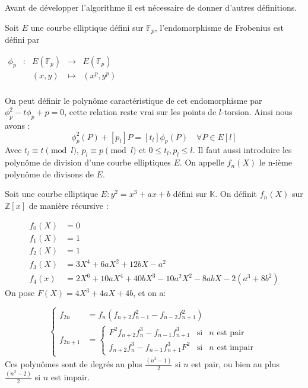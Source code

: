 \documentclass{article}
\begin{document}
Avant de développer l'algorithme il est nécessaire de donner d'autres définitions. 

\begin{defi}[Frobenius]
Soit $E$ une courbe elliptique défini sur $\mathbb{F}_p$, l'endomorphisme de Frobenius est défini par 

$\begin{array}{ccccc}
\phi_p & : & E(\mathbb{F}_p) & \to & E(\mathbb{F}_p) \\
 & & (x,y) & \mapsto & (x^p, y^p) \\
\end{array}$
\end{defi}
On peut définir le polynôme caractéristique de cet endomorphisme par $\phi_p^2 - t \phi_p + p = 0$, cette relation reste vrai sur les points de $l$-torsion. Ainsi nous avons : 
\begin{equation}
\label{eqnfrobenius}
 \phi_p^2(P)  + [p_l]P = [t_{l}] \phi_p(P) \quad \forall P \in E[l]
\end{equation} 
Avec $t_l \equiv t \pmod l$, $p_l \equiv p \pmod l$ et $0 \leq t_l, p_l \leq l$.
Il faut aussi introduire les polynôme de division d'une courbe elliptiques $E$. On appelle $f_n(X)$ le n-ième polynôme de divisons de $E$.

\begin{defi}
Soit une courbe elliptique $E : y^2 = x^3 + ax+b$ défini sur $\mathbb{K}$. On définit $f_n(X)$ sur $\mathbb{Z}[x]$ de manière récursive : 


\begin{align*}
f_0(X) &= 0 \\
f_1(X) &= 1 \\
f_2(X) &= 1 \\
f_3(X) &= 3X^4 + 6aX^2 +12bX - a^2 \\
f_4(x) &= 2X^6 + 10aX^4 +40bX^3 - 10a^2X^2 - 8abX - 2(a^3 + 8b^2)
\end{align*}
On pose $F(X)= 4X^3 + 4aX + 4b$, et on a:

\begin{equation}
\left\lbrace
\begin{array}{ll}
f_{2n}& =  f_n(f_{n+2}f_{n-1}^2 - f_{n-2}f_{n+1}^2)   \\
f_{2n+1}& = \left\lbrace 
\begin{array}{ccc}
F^2f_{n+2}f_n^3 - f_{n-1}f_{n+1}^3 & \mbox{si} & n \text{ est pair}\\
f_{n+2}f_n^3 - f_{n-1}f_{n+1}^3F^2 & \mbox{si} & n \text{ est impair} \end{array}\right.

\end{array} \right.
\end{equation} 
Ces polynômes sont de degrés au plus $\frac{(n^2 -1)}{2}$ si $n$ est pair, ou bien  au plus $\frac{(n^2 -2)}{2}$ si $n$ est impair.
\end{defi}
\end{document}
